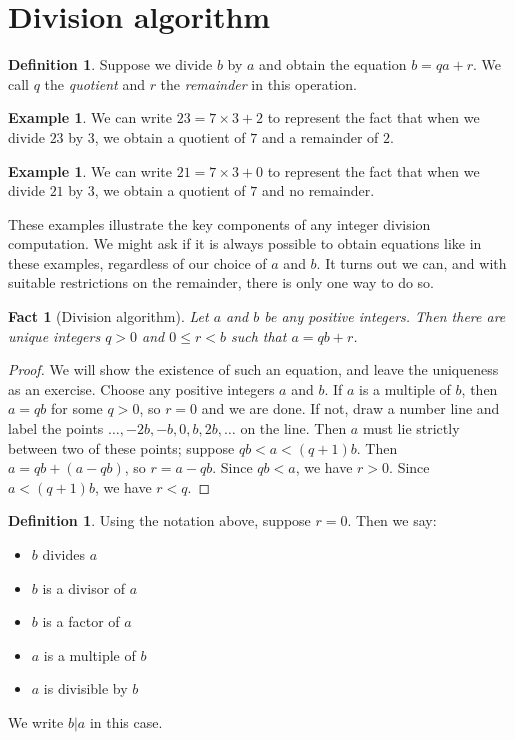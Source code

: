 \documentclass{book}
\theoremstyle{plain}
\newtheorem{fact}[theorem]{Fact}
\theoremstyle{definition}
\newtheorem{definition}[theorem]{Definition}
\newtheorem{example}[theorem]{Example}
\begin{document}
\section{Division algorithm}
\begin{definition}
Suppose we divide $b$ by $a$ and obtain the equation $b = qa + r$. We call $q$ the {\it quotient} and $r$ the {\it remainder} in this operation.
\end{definition}

\begin{example}
We can write $23 = 7 \times 3 + 2$ to represent the fact that when we divide $23$ by $3$, we obtain a quotient of $7$ and a remainder of $2$.
\end{example}

\begin{example}
We can write $21 = 7 \times 3 + 0$ to represent the fact that when we divide $21$ by $3$, we obtain a quotient of $7$ and no remainder.
\end{example}

These examples illustrate the key components of any integer division computation. We might ask if it is always possible to obtain equations like in these examples, regardless of our choice of $a$ and $b$. It turns out we can, and with suitable restrictions on the remainder, there is only one way to do so.

\begin{fact}[Division algorithm]
Let $a$ and $b$ be any positive integers. Then there are unique integers $q > 0$ and $0 \leq r < b$ such that $a = qb + r$.
\end{fact}

\begin{proof}
We will show the existence of such an equation, and leave the uniqueness as an exercise. Choose any positive integers $a$ and $b$. If $a$ is a multiple of $b$, then $a = qb$ for some $q > 0$, so $r = 0$ and we are done. If not, draw a number line and label the points $\ldots, -2b, -b, 0, b, 2b, \ldots$ on the line. Then $a$ must lie strictly between two of these points; suppose $qb < a < (q+1)b$. Then $a = qb + (a - qb)$, so $r = a - qb$. Since $qb < a$, we have $r > 0$. Since $a < (q+1)b$, we have $r < q$.
\end{proof}

\begin{definition}
Using the notation above, suppose $r = 0$. Then we say:
\begin{itemize}
\item $b$ divides $a$
\item $b$ is a divisor of $a$
\item $b$ is a factor of $a$
\item $a$ is a multiple of $b$
\item $a$ is divisible by $b$
\end{itemize}
We write $b | a$ in this case.
\end{definition}
\end{document}
